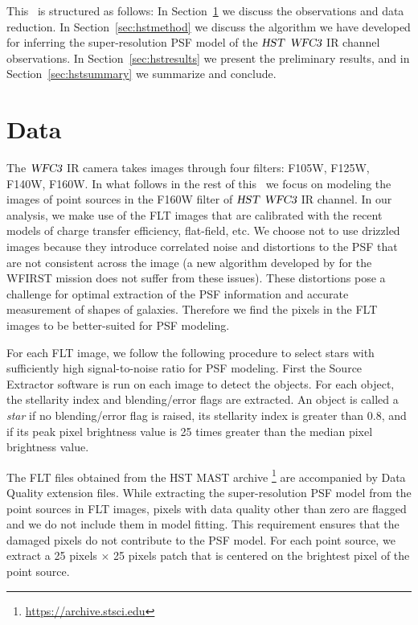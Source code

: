 This \paper\ is structured as follows: In Section~\ref{sec:hstdata} we discuss the observations and data reduction. In Section~\ref{sec:hstmethod} we discuss the algorithm we 
have developed for inferring the super-resolution PSF model of the ${\textsl{HST}}$ ${\textsl{WFC3}}$ IR channel observations. In Section~\ref{sec:hstresults} we present the preliminary results, and %
in Section~\ref{sec:hstsummary} we summarize and conclude. 

\section{Data}\label{sec:hstdata}

The ${\textsl{WFC3}}$ IR camera takes images through four filters: F105W, F125W, F140W, F160W.
In what follows in the rest of this \paper\ we focus on modeling the images of point sources in the F160W filter of ${\textsl{HST}}$ ${\textsl{WFC3}}$ IR channel. 
In our analysis, we make use of the FLT images that are calibrated with the recent models of charge transfer efficiency, flat-field, etc. 
We choose not to use drizzled images \citep{drizzle,astrodrizzle} because they introduce correlated noise and 
distortions to the PSF that are not consistent across the image (a new algorithm developed by \citealt{olic} for the WFIRST mission does not suffer from these issues). 
These distortions pose a challenge for optimal extraction of the PSF information and accurate measurement of shapes of galaxies. Therefore we find the pixels in the FLT images to be better-suited for PSF modeling. 

For each FLT image, we follow the following procedure to select stars with sufficiently high signal-to-noise ratio 
for PSF modeling. First the Source Extractor software \citep{sextractor} is run on each image to detect the objects. 
For each object, the stellarity index and blending/error flags are extracted. An object is called a \emph{star} if no blending/error flag is 
raised, its stellarity index is greater than 0.8, and if its peak pixel brightness value is 25 times greater than the median pixel brightness 
value.  

The FLT files obtained from the HST MAST archive \footnote{\url{https://archive.stsci.edu}} are accompanied by Data Quality extension files. 
While extracting the super-resolution PSF model from the point sources in FLT images, pixels with data quality other than zero are flagged and we do not include them in model fitting. This requirement ensures that the damaged pixels do not contribute to the PSF model. For each point source, we extract a 25 pixels $\times$ 25 pixels patch that is centered on the brightest pixel of the point source.   

